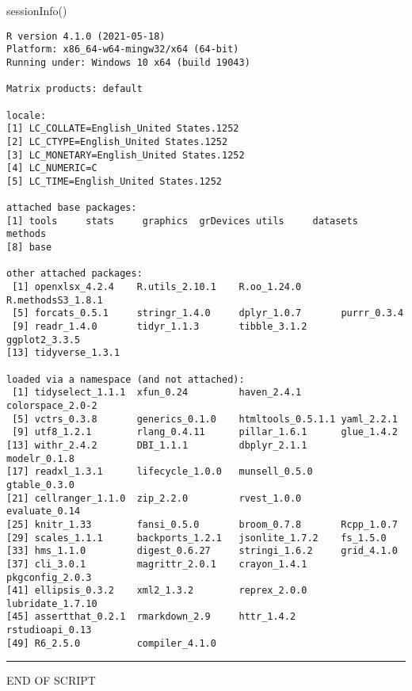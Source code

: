 \documentclass[
]{article}
\newenvironment{Shaded}{\begin{snugshade}}{\end{snugshade}}
\newcommand{\FunctionTok}[1]{\textcolor[rgb]{0.00,0.00,0.00}{#1}}
\newcommand{\NormalTok}[1]{#1}
\begin{document}
\begin{Shaded}
\begin{Highlighting}[]
\FunctionTok{sessionInfo}\NormalTok{()}
\end{Highlighting}
\end{Shaded}

\begin{verbatim}
R version 4.1.0 (2021-05-18)
Platform: x86_64-w64-mingw32/x64 (64-bit)
Running under: Windows 10 x64 (build 19043)

Matrix products: default

locale:
[1] LC_COLLATE=English_United States.1252 
[2] LC_CTYPE=English_United States.1252   
[3] LC_MONETARY=English_United States.1252
[4] LC_NUMERIC=C                          
[5] LC_TIME=English_United States.1252    

attached base packages:
[1] tools     stats     graphics  grDevices utils     datasets  methods  
[8] base     

other attached packages:
 [1] openxlsx_4.2.4    R.utils_2.10.1    R.oo_1.24.0       R.methodsS3_1.8.1
 [5] forcats_0.5.1     stringr_1.4.0     dplyr_1.0.7       purrr_0.3.4      
 [9] readr_1.4.0       tidyr_1.1.3       tibble_3.1.2      ggplot2_3.3.5    
[13] tidyverse_1.3.1  

loaded via a namespace (and not attached):
 [1] tidyselect_1.1.1  xfun_0.24         haven_2.4.1       colorspace_2.0-2 
 [5] vctrs_0.3.8       generics_0.1.0    htmltools_0.5.1.1 yaml_2.2.1       
 [9] utf8_1.2.1        rlang_0.4.11      pillar_1.6.1      glue_1.4.2       
[13] withr_2.4.2       DBI_1.1.1         dbplyr_2.1.1      modelr_0.1.8     
[17] readxl_1.3.1      lifecycle_1.0.0   munsell_0.5.0     gtable_0.3.0     
[21] cellranger_1.1.0  zip_2.2.0         rvest_1.0.0       evaluate_0.14    
[25] knitr_1.33        fansi_0.5.0       broom_0.7.8       Rcpp_1.0.7       
[29] scales_1.1.1      backports_1.2.1   jsonlite_1.7.2    fs_1.5.0         
[33] hms_1.1.0         digest_0.6.27     stringi_1.6.2     grid_4.1.0       
[37] cli_3.0.1         magrittr_2.0.1    crayon_1.4.1      pkgconfig_2.0.3  
[41] ellipsis_0.3.2    xml2_1.3.2        reprex_2.0.0      lubridate_1.7.10 
[45] assertthat_0.2.1  rmarkdown_2.9     httr_1.4.2        rstudioapi_0.13  
[49] R6_2.5.0          compiler_4.1.0   
\end{verbatim}

\begin{center}\rule{0.5\linewidth}{0.5pt}\end{center}

END OF SCRIPT
\end{document}
